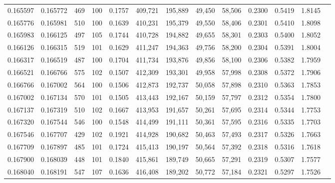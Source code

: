 \begin{tabular}{rrrrrrrrrrrrr}
0.165597 & 0.165772 &   469 & 100 &                                     0.1757 & 409,721 & 195,889 &  49,450 &  58,506 & 0.2300 & 0.5419 & 1.8145 \\
0.165776 & 0.165981 &   510 & 100 &                                     0.1639 & 410,231 & 195,379 &  49,550 &  58,406 & 0.2301 & 0.5410 & 1.8098 \\
0.165983 & 0.166125 &   497 & 105 &                                     0.1744 & 410,728 & 194,882 &  49,655 &  58,301 & 0.2303 & 0.5400 & 1.8052 \\
0.166126 & 0.166315 &   519 & 101 &                                     0.1629 & 411,247 & 194,363 &  49,756 &  58,200 & 0.2304 & 0.5391 & 1.8004 \\
0.166317 & 0.166519 &   487 & 100 &                                     0.1704 & 411,734 & 193,876 &  49,856 &  58,100 & 0.2306 & 0.5382 & 1.7959 \\
0.166521 & 0.166766 &   575 & 102 &                                     0.1507 & 412,309 & 193,301 &  49,958 &  57,998 & 0.2308 & 0.5372 & 1.7906 \\
0.166766 & 0.167002 &   564 & 100 &                                     0.1506 & 412,873 & 192,737 &  50,058 &  57,898 & 0.2310 & 0.5363 & 1.7853 \\
0.167002 & 0.167134 &   570 & 101 &                                     0.1505 & 413,443 & 192,167 &  50,159 &  57,797 & 0.2312 & 0.5354 & 1.7800 \\
0.167137 & 0.167319 &   510 & 102 &                                     0.1667 & 413,953 & 191,657 &  50,261 &  57,695 & 0.2314 & 0.5344 & 1.7753 \\
0.167320 & 0.167544 &   546 & 100 &                                     0.1548 & 414,499 & 191,111 &  50,361 &  57,595 & 0.2316 & 0.5335 & 1.7703 \\
0.167546 & 0.167707 &   429 & 102 &                                     0.1921 & 414,928 & 190,682 &  50,463 &  57,493 & 0.2317 & 0.5326 & 1.7663 \\
0.167709 & 0.167897 &   485 & 101 &                                     0.1724 & 415,413 & 190,197 &  50,564 &  57,392 & 0.2318 & 0.5316 & 1.7618 \\
0.167900 & 0.168039 &   448 & 101 &                                     0.1840 & 415,861 & 189,749 &  50,665 &  57,291 & 0.2319 & 0.5307 & 1.7577 \\
0.168040 & 0.168191 &   547 & 107 &                                     0.1636 & 416,408 & 189,202 &  50,772 &  57,184 & 0.2321 & 0.5297 & 1.7526 \\

\end{tabular}
